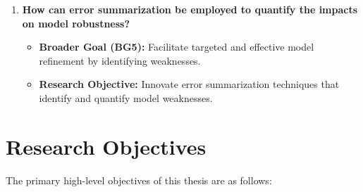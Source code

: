 \begin{enumerate}
    \item \textbf{How can error summarization be employed to quantify the impacts on model robustness?}
        \begin{itemize}
            \item \textbf{Broader Goal (BG5):} Facilitate targeted and effective model refinement by identifying weaknesses.
            \item \textbf{Research Objective:} Innovate error summarization techniques that identify and quantify model weaknesses.
        \end{itemize}
\end{enumerate}

\section{Research Objectives}

The primary high-level objectives of this thesis are as follows:

